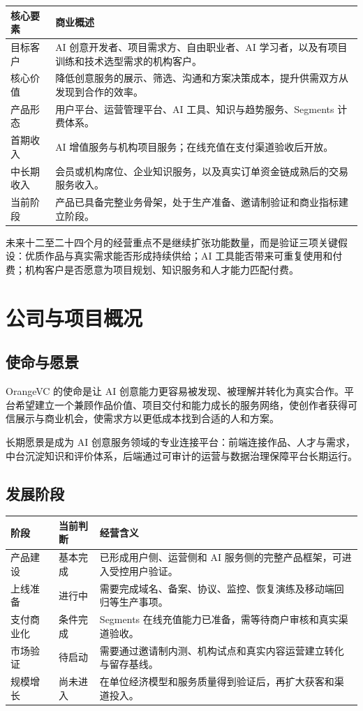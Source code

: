 \documentclass[12pt,a4paper,openany,fontset=fandol]{ctexrep}
\begin{document}
\begin{longtable}{p{3.3cm} p{10.4cm}}
\toprule
核心要素 & 商业概述 \\
\midrule
目标客户 & AI 创意开发者、项目需求方、自由职业者、AI 学习者，以及有项目训练和技术选型需求的机构客户。 \\
核心价值 & 降低创意服务的展示、筛选、沟通和方案决策成本，提升供需双方从发现到合作的效率。 \\
产品形态 & 用户平台、运营管理平台、AI 工具、知识与趋势服务、Segments 计费体系。 \\
首期收入 & AI 增值服务与机构项目服务；在线充值在支付渠道验收后开放。 \\
中长期收入 & 会员或机构席位、企业知识服务，以及真实订单资金链成熟后的交易服务收入。 \\
当前阶段 & 产品已具备完整业务骨架，处于生产准备、邀请制验证和商业指标建立阶段。 \\
\bottomrule
\end{longtable}

未来十二至二十四个月的经营重点不是继续扩张功能数量，而是验证三项关键假设：优质作品与真实需求能否形成持续供给；AI 工具能否带来可重复使用和付费；机构客户是否愿意为项目规划、知识服务和人才能力匹配付费。

\chapter{公司与项目概况}

\section{使命与愿景}

OrangeVC 的使命是让 AI 创意能力更容易被发现、被理解并转化为真实合作。平台希望建立一个兼顾作品价值、项目交付和能力成长的服务网络，使创作者获得可信展示与商业机会，使需求方以更低成本找到合适的人和方案。

长期愿景是成为 AI 创意服务领域的专业连接平台：前端连接作品、人才与需求，中台沉淀知识和评价体系，后端通过可审计的运营与数据治理保障平台长期运行。

\section{发展阶段}

\begin{longtable}{p{3cm} p{4cm} p{6.7cm}}
\toprule
阶段 & 当前判断 & 经营含义 \\
\midrule
产品建设 & 基本完成 & 已形成用户侧、运营侧和 AI 服务侧的完整产品框架，可进入受控用户验证。 \\
上线准备 & 进行中 & 需要完成域名、备案、协议、监控、恢复演练及移动端回归等生产事项。 \\
支付商业化 & 条件完成 & Segments 在线充值能力已准备，需等待商户审核和真实渠道验收。 \\
市场验证 & 待启动 & 需要通过邀请制内测、机构试点和真实内容运营建立转化与留存基线。 \\
规模增长 & 尚未进入 & 在单位经济模型和服务质量得到验证后，再扩大获客和渠道投入。 \\
\bottomrule
\end{longtable}
\end{document}
